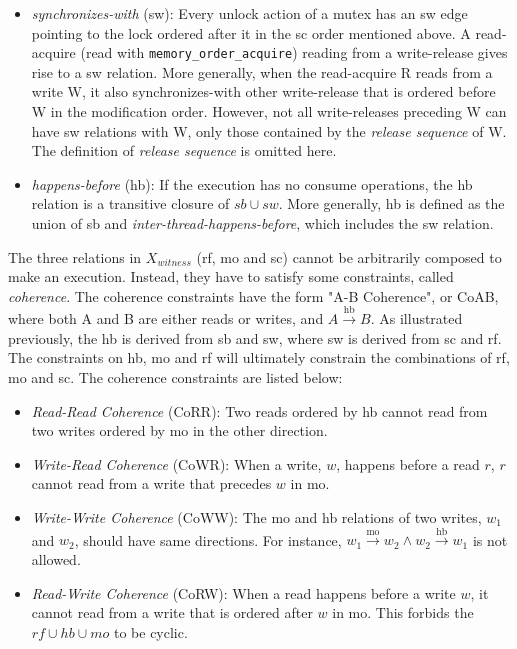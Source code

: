 \begin{itemize}
	\item \textit{synchronizes-with} (sw): Every unlock action of a mutex has an sw edge pointing to the lock ordered after it in the sc order mentioned above. A read-acquire (read with \texttt{memory\_order\_acquire}) reading from a write-release gives rise to a sw relation. More generally, when the read-acquire R reads from a write W, it also synchronizes-with other write-release that is ordered before W in the modification order. However, not all write-releases preceding W can have sw relations with W, only those contained by the \textit{release sequence} of W. The definition of \textit{release sequence} is omitted here.
	\item \textit{happens-before} (hb): If the execution has no consume operations, the hb relation is a transitive closure of $sb \cup sw$. More generally, hb is defined as the union of sb and \textit{inter-thread-happens-before}, which includes the sw relation.
\end{itemize}


The three relations in $X_{witness}$ (rf, mo and sc) cannot be arbitrarily composed to make an execution. Instead, they have to satisfy some constraints, called \textit{coherence}. The coherence constraints have the form "A-B Coherence", or CoAB, where both A and B are either reads or writes, and $A \xrightarrow{\text{hb}} B$. As illustrated previously, the hb is derived from sb and sw, where sw is derived from sc and rf. The constraints on hb, mo and rf will ultimately constrain the combinations of rf, mo and sc. The coherence constraints are listed below:

\begin{itemize}
	\item \textit{Read-Read Coherence} (CoRR): Two reads ordered by hb cannot read from two writes ordered by mo in the other direction.
	\item \textit{Write-Read Coherence} (CoWR): When a write, $w$, happens before a read $r$, $r$ cannot read from a write that precedes $w$ in mo.
	\item \textit{Write-Write Coherence} (CoWW): The mo and hb relations of two writes, $w_1$ and $w_2$, should have same directions. For instance, $w_1 \xrightarrow{\text{mo}} w_2 \land w_2 \xrightarrow{\text{hb}} w_1$ is not allowed.
	\item \textit{Read-Write Coherence} (CoRW): When a read happens before a write $w$, it cannot read from a write that is ordered after $w$ in mo. This forbids the $rf \cup hb \cup mo$ to be cyclic.
\end{itemize}



